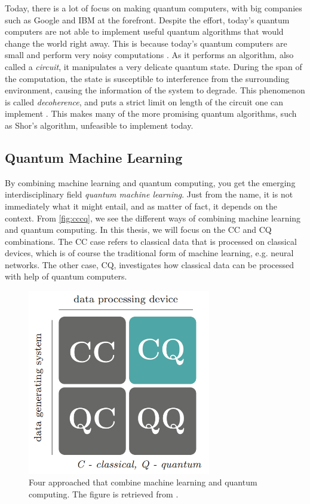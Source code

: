 Today, there is a lot of focus on making quantum computers, with big companies such as Google and IBM at the forefront. Despite the effort, today's quantum computers are not able to implement useful quantum algorithms that would change the world right away. This is because today's quantum computers are small and perform very noisy computations \cite{Preskill_2018}. As it performs an algorithm, also called a \emph{circuit}, it manipulates a very delicate quantum state. During the span of the computation, the state is susceptible to interference from the surrounding environment, causing the information of the system to degrade. This phenomenon is called \emph{decoherence}, and puts a strict limit on length of the circuit one can implement \cite{saki2019study}. This makes many of the more promising quantum algorithms, such as Shor's algorithm, unfeasible to implement today.


\subsection{Quantum Machine Learning}\label{sec:Quantum Machine Learning}
By combining machine learning and quantum computing, you get the emerging interdisciplinary field \emph{quantum machine learning}. Just from the name, it is not immediately what it might entail, and as matter of fact, it depends on the context. From \autoref{fig:cccq}, we see the different ways of combining machine learning and quantum computing. In this thesis, we will focus on the CC and CQ combinations. The CC case refers to classical data that is processed on classical devices, which is of course the traditional form of machine learning, e.g. neural networks. The other case, CQ, investigates how classical data can be processed with help of quantum computers.

\begin{figure}[htp]
    \centering
    \includegraphics[width=8cm]{latex/figures/cccq.PNG}
    \caption{Four approached that combine machine learning and quantum computing. The figure is retrieved from \citet{SupervisedwquantumComputers}.}
    \label{fig:cccq}
\end{figure}

